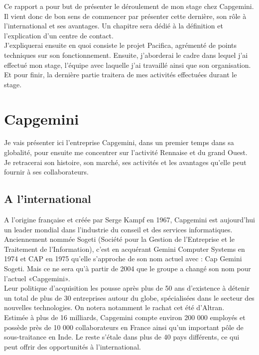 \documentclass{rapport}
\begin{document}
Ce rapport a pour but de présenter le déroulement de mon stage chez Capgemini. Il vient donc de bon sens de commencer par présenter cette dernière, son rôle à l'international et ses avantages.
Un chapitre sera dédié à la définition et l'explication d'un centre de contact.\\
J'expliquerai ensuite en quoi consiste le projet Pacifica, agrémenté de points techniques sur son fonctionnement.
Ensuite, j'aborderai le cadre dans lequel j'ai effectué mon stage, l'équipe avec laquelle j'ai travaillé ainsi que son organisation.\\
Et pour finir, la dernière partie traitera de mes activités effectuées durant le stage.

\newpage

\section{Capgemini}

Je vais présenter ici l'entreprise Capgemini, dans un premier temps dans sa globalité, pour ensuite me concentrer sur l’activité Rennaise et du grand Ouest. Je retracerai son histoire, son marché, ses activités et les avantages qu'elle peut fournir à ses collaborateurs.

\subsection{A l'international}

A l'origine française et créée par Serge Kampf en 1967, Capgemini est aujourd'hui un leader mondial dans l'industrie du conseil et des services informatiques. Anciennement nommée Sogeti (Société pour la Gestion de l'Entreprise et le Traitement de l'Information), c'est en acquérant Gemini Computer Systems en 1974 et CAP en 1975 qu'elle s'approche de son nom actuel avec : Cap Gemini Sogeti. Mais ce ne sera qu'à partir de 2004 que le groupe a changé son nom pour l'actuel «Capgemini».\\

Leur politique d'acquisition les pousse après plus de 50 ans d'existence à détenir un total de plus de 30 entreprises autour du globe, spécialisées dans le secteur des nouvelles technologies. On notera notamment le rachat cet été d'Altran.\\
Estimée à plus de 16 milliards, Capgemini compte environ 200 000 employés et possède près de 10 000 collaborateurs en France ainsi qu'un important pôle de sous-traitance en Inde. Le reste s’étale dans plus de 40 pays différents, ce qui peut offrir des opportunités à l'international.
\end{document}
